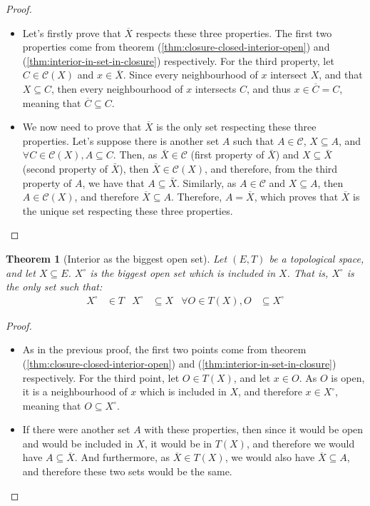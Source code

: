 \documentclass{article}
\newtheorem{theorem}{Theorem}[section]
\theoremstyle{definition}
\theoremstyle{remark}
\theoremstyle{example}
\theoremstyle{notation}
\newcommand{\inter}[1]{{{#1}^\circ}}
\newcommand{\adher}[1]{{\overline{#1}}}
\newcommand{\closed}{\mathcal{C}}
\begin{document}
\begin{proof}~
		\begin{itemize}
				\item Let's firstly prove that $\overline{X}$ respects these three properties. The first two properties come from theorem (\ref{thm:closure-closed-interior-open}) and (\ref{thm:interior-in-set-in-closure}) respectively. For the third property, let $C \in \closed(X)$ and $x \in \adher{X}$. Since every neighbourhood of $x$ intersect $X$, and that $X \subseteq C$, then every neighbourhood of $x$ intersects $C$, and thus $x \in \adher{C} = C$, meaning that $\adher{C} \subseteq C$.
				\item We now need to prove that $\overline{X}$ is the only set respecting these three properties. Let's suppose there is another set $A$ such that $A \in \closed$, $X \subseteq A$, and $\forall C \in \closed(X), A \subseteq C$. Then, as $\bar{X} \in \closed$ (first property of $\bar{X}$) and $X \subseteq \bar{X}$ (second property of $\bar{X}$), then $\bar{X} \in \closed(X)$, and therefore, from the third property of $A$, we have that $A \subseteq \bar{X}$. Similarly, as $A \in \closed$ and $X \subseteq A$, then $A \in \closed(X)$, and therefore $\overline{X} \subseteq A$. Therefore, $A = \overline{X}$, which proves that $\overline{X}$ is the unique set respecting these three properties.
		\end{itemize}
\end{proof}

\begin{theorem}[Interior as the biggest open set] \label{thm:interior-charac}
		Let $(E, T)$ be a topological space, and let $X \subseteq E$. $\inter{X}$ is the biggest open set which is included in $X$. That is, $\inter{X}$ is the only set such that:
		\begin{align*}
				\inter{X} &\in T & \inter{X} &\subseteq X & \forall O \in T(X), O &\subseteq \inter{X}
		\end{align*}
\end{theorem}

\begin{proof}~
		\begin{itemize}
				\item As in the previous proof, the first two points come from theorem (\ref{thm:closure-closed-interior-open}) and (\ref{thm:interior-in-set-in-closure}) respectively. For the third point, let $O \in T(X)$, and let $x \in O$. As $O$ is open, it is a neighbourhood of $x$ which is included in $X$, and therefore $x \in \inter{X}$, meaning that $O \subseteq \inter{X}$.
				\item If there were another set $A$ with these properties, then since it would be open and would be included in $X$, it would be in $T(X)$, and therefore we would have $A \subseteq \overline{X}$. And furthermore, as $\overline{X} \in T(X)$, we would also have $\overline{X} \subseteq A$, and therefore these two sets would be the same.
		\end{itemize} 
\end{proof}
\end{document}
